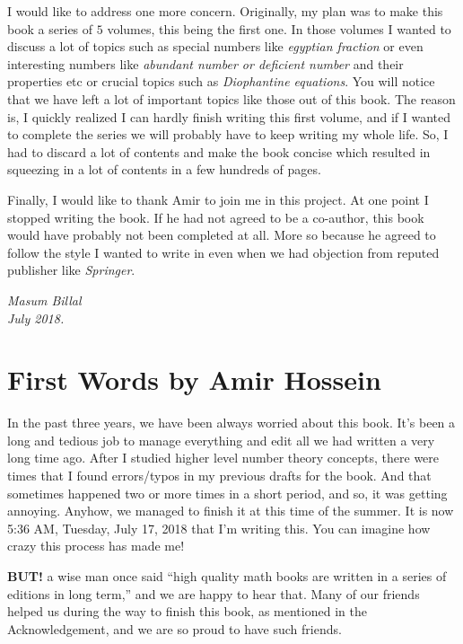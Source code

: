 \documentclass[leqno, 12pt]{book}
\begin{document}
I would like to address one more concern. Originally, my plan was to make this book a series of $5$ volumes, this being the first one. In those volumes I wanted to discuss a lot of topics such as special numbers like \textit{egyptian fraction} or even interesting numbers like \textit{abundant number or deficient number} and their properties etc or crucial topics such as \textit{Diophantine equations}. You will notice that we have left a lot of important topics like those out of this book. The reason is, I quickly realized I can hardly finish writing this first volume, and if I wanted to complete the series we will probably have to keep writing my whole life. So, I had to discard a lot of contents and make the book concise which resulted in squeezing in a lot of contents in a few hundreds of pages. 


Finally, I would like to thank Amir to join me in this project. At one point I stopped writing the book. If he had not agreed to be a co-author, this book would have probably not been completed at all. More so because he agreed to follow the style I wanted to write in even when we had objection from reputed publisher like \textit{Springer}.

\begin{flushright}

	\sl Masum Billal\\

	July 2018.
\end{flushright}
	
	\newpage
	
\section*{First Words by Amir Hossein}
	In the past three years, we have been always worried about this book. It's been a long and tedious job to manage everything and edit all we had written a very long time ago. After I studied higher level number theory concepts, there were times that I found errors/typos in my previous drafts for the book. And that sometimes happened two or more times in a short period, and so, it was getting annoying. Anyhow, we managed to finish it at this time of the summer. It is now 5:36 AM, Tuesday, July 17, 2018 that I'm writing this. You can imagine how crazy this process has made me!
	
	\vspace{0.3cm}
	
	\textbf{BUT!} a wise man once said ``high quality math books are written in a series of editions in long term,'' and we are happy to hear that. Many of our friends helped us during the way to finish this book, as mentioned in the Acknowledgement, and we are so proud to have such friends.
	
\end{document}
